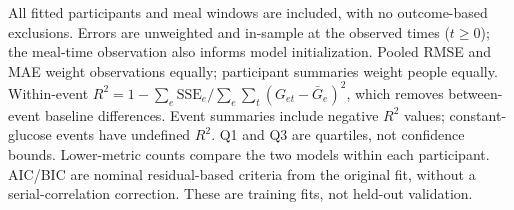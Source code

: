 \begin{table}[htbp]
\centering
\caption{Overall in-sample goodness of fit across all fitted participants and meals.}
\label{tab:fit-overall}
\small
{}
\par\smallskip
\begin{minipage}{\linewidth}\footnotesize
All fitted participants and meal windows are included, with no outcome-based exclusions. Errors are unweighted and in-sample at the observed times ($t\geq0$); the meal-time observation also informs model initialization. Pooled RMSE and MAE weight observations equally; participant summaries weight people equally. Within-event $R^2=1-\sum_e\mathrm{SSE}_e/\sum_e\sum_t(G_{et}-\bar G_e)^2$, which removes between-event baseline differences. Event summaries include negative $R^2$ values; constant-glucose events have undefined $R^2$. Q1 and Q3 are quartiles, not confidence bounds. Lower-metric counts compare the two models within each participant. AIC/BIC are nominal residual-based criteria from the original fit, without a serial-correlation correction. These are training fits, not held-out validation.
\end{minipage}
\end{table}
